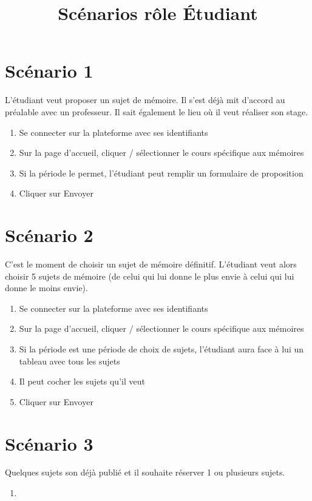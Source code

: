 \documentclass[a4paper, 11pt]{article}
\title{Scénarios rôle \bf \'Etudiant}
\author{}
\begin{document}
\maketitle

\section*{Scénario 1}
L'étudiant veut proposer un sujet de mémoire. Il s'est déjà mit d'accord au préalable avec un professeur. Il sait également le lieu où il veut réaliser son stage.

\begin{tcolorbox}
    \begin{enumerate}
        \item Se connecter sur la plateforme avec ses identifiants
        \item Sur la page d'accueil, cliquer / sélectionner le cours spécifique aux mémoires
        \item Si la période le permet, l'étudiant peut remplir un formulaire de proposition
        \item Cliquer sur Envoyer
    \end{enumerate}
\end{tcolorbox}

\section*{Scénario 2}
C'est le moment de choisir un sujet de mémoire définitif. L'étudiant veut alors choisir 5 sujets de mémoire (de celui qui lui donne le plus envie à celui qui lui donne le moins envie).

\begin{tcolorbox}
    \begin{enumerate}
        \item Se connecter sur la plateforme avec ses identifiants
        \item Sur la page d'accueil, cliquer / sélectionner le cours spécifique aux mémoires
        \item Si la période est une période de choix de sujets, l'étudiant aura face à lui un tableau avec tous les sujets
        \item Il peut cocher les sujets qu'il veut
        \item Cliquer sur Envoyer
    \end{enumerate}
\end{tcolorbox}

\section*{Scénario 3}
Quelques sujets son déjà publié et il souhaite réserver 1 ou plusieurs sujets.

\begin{tcolorbox}
    \begin{enumerate}
        \item 
    \end{enumerate}
\end{tcolorbox}
\end{document}

